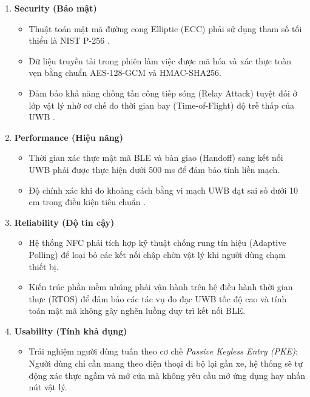 \begin{enumerate}
    \item \textbf{Security (Bảo mật)}
    \begin{itemize}
        \item Thuật toán mật mã đường cong Elliptic (ECC) phải sử dụng tham số tối thiểu là NIST P-256 \cite{fips186,nist_ecdh}.
        \item Dữ liệu truyền tải trong phiên làm việc được mã hóa và xác thực toàn vẹn bằng chuẩn AES-128-GCM và HMAC-SHA256.
        \item Đảm bảo khả năng chống tấn công tiếp sóng (Relay Attack) tuyệt đối ở lớp vật lý nhờ cơ chế đo thời gian bay (Time-of-Flight) độ trễ thấp của UWB \cite{ieee802154z,neirynck2016overview}.
    \end{itemize}

    \item \textbf{Performance (Hiệu năng)}
    \begin{itemize}
        \item Thời gian xác thực mật mã BLE và bàn giao (Handoff) sang kết nối UWB phải được thực hiện dưới 500 ms để đảm bảo tính liền mạch.
        \item Độ chính xác khi đo khoảng cách bằng vi mạch UWB đạt sai số dưới 10 cm trong điều kiện tiêu chuẩn \cite{ieee802154z,decawave2017,sidorenko2020accurate}.
    \end{itemize}

    \item \textbf{Reliability (Độ tin cậy)}
    \begin{itemize}
        \item Hệ thống NFC phải tích hợp kỹ thuật chống rung tín hiệu (Adaptive Polling) để loại bỏ các kết nối chập chờn vật lý khi người dùng chạm thiết bị.
        \item Kiến trúc phần mềm nhúng phải vận hành trên hệ điều hành thời gian thực (RTOS) để đảm bảo các tác vụ đo đạc UWB tốc độ cao và tính toán mật mã không gây nghẽn luồng duy trì kết nối BLE.
    \end{itemize}

    \item \textbf{Usability (Tính khả dụng)}
    \begin{itemize}
        \item Trải nghiệm người dùng tuân theo cơ chế \textit{Passive Keyless Entry (PKE)}: Người dùng chỉ cần mang theo điện thoại đi bộ lại gần xe, hệ thống sẽ tự động xác thực ngầm và mở cửa mà không yêu cầu mở ứng dụng hay nhấn nút vật lý.
    \end{itemize}


\end{enumerate}
